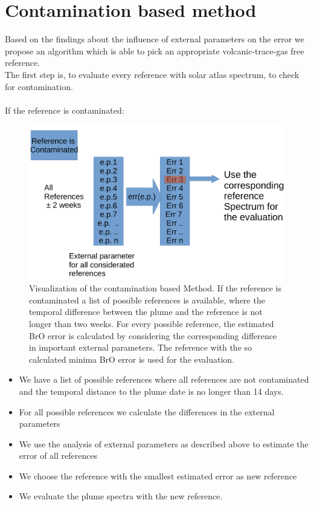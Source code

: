 \documentclass  [
  paper    = a4,
  BCOR     = 10mm,
  twoside,
  fontsize = 12pt,
  fleqn,
  toc      = bibnumbered,
  toc      = listofnumbered,
  numbers  = noendperiod,
  headings = normal,
  listof   = leveldown,
  version  = 3.03
]                                       {scrreprt}
\begin{document}
\chapter{Contamination based method}
	Based on the findings about the influence of external parameters on the  error we propose an algorithm which is able to pick an appropriate volcanic-trace-gas free reference.\\ 
	The first step is, to evaluate every reference with solar atlas spectrum, to check for contamination.\\
	\\
	If the reference is contaminated:
	\begin{figure}
		\centering
		\includegraphics[width=0.7\linewidth]{Bilder/Cont}
		\caption{Visualization of the contamination based Method. If the reference is contaminated a list of possible references is available, where the temporal difference between the plume and the reference is not longer than two weeks. For every possible reference, the estimated BrO error is calculated by considering the corresponding difference in important external parameters. The reference with the so calculated minima BrO error is used for the evaluation.}
		\label{fig:Cont}
	\end{figure}

	\begin{itemize}
		\item We have a list of possible references where all references are not contaminated and the temporal distance to the plume date is no longer than 14 days.
		\item For all possible references we calculate the differences in the external parameters
		\item We use the analysis of external parameters as described above to estimate the  error of all references
		\item We choose the reference with the smallest estimated  error as new reference
		\item We evaluate the plume spectra with the new reference.
	\end{itemize}
\end{document}
